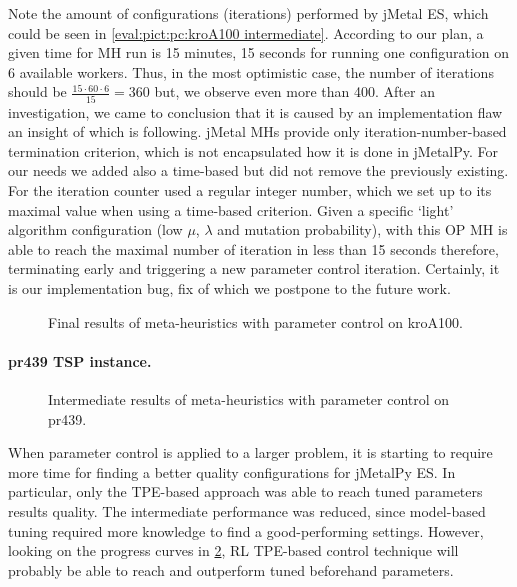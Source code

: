 Note the amount of configurations (iterations) performed by jMetal ES, which could be seen in \cref{eval:pict:pc:kroA100 intermediate}. According to our plan, a given time for MH run is 15 minutes, 15 seconds for running one configuration on 6 available workers. Thus, in the most optimistic case, the number of iterations should be $ \frac{15\cdot60\cdot6}{15} = 360$ but, we observe even more than 400. After an investigation, we came to conclusion that it is caused by an implementation flaw an insight of which is following. jMetal MHs provide only iteration-number-based termination criterion, which is not encapsulated how it is done in jMetalPy. For our needs we added also a time-based but did not remove the previously existing. For the iteration counter used a regular integer number, which we set up to its maximal value when using a time-based criterion. Given a specific `light' algorithm configuration (low $\mu$, $\lambda$ and mutation probability), with this OP MH is able to reach the maximal number of iteration in less than 15 seconds therefore, terminating early and triggering a new parameter control iteration. Certainly, it is our implementation bug, fix of which we postpone to the future work.


\begin{figure}[b]
	\centering
	
	\caption{Final results of meta-heuristics with parameter control on kroA100.}
	\label{eval:pict:pc:kroA100 final}
\end{figure}

\newpage
\paragraph{pr439 TSP instance.}
\begin{figure}[t]
	\centering
	
	\caption{Intermediate results of meta-heuristics with parameter control on pr439.}
	\label{eval:pict:pc:pr439 intermediate}
\end{figure}

When parameter control is applied to a larger problem, it is starting to require more time for finding a better quality configurations for jMetalPy ES. In particular, only the TPE-based approach was able to reach tuned parameters results quality. The intermediate performance was reduced, since model-based tuning required more knowledge to find a good-performing settings. However, looking on the progress curves in \cref{eval:pict:pc:pr439 intermediate}, RL TPE-based control technique will probably be able to reach and outperform tuned beforehand parameters.

